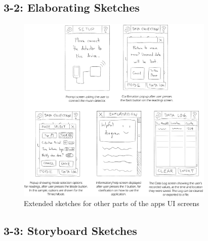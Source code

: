 \documentclass[11pt,a4paper]{article}
\begin{document}
\subsection*{3-2: Elaborating Sketches}
\def\textfraction{.01}
\def\topfraction{.99}
\bigskip
\begin{figure}[b!]
  \centering
  \hspace*{-1cm}
  \renewcommand{\textfraction}{0.05} 
      \includegraphics[width=0.84\textwidth]{elaboratingsketches.png}
  \caption{Extended sketches for other parts of the apps UI screens}
\end{figure}

\newpage
\subsection*{3-3: Storyboard Sketches}
\end{document}
